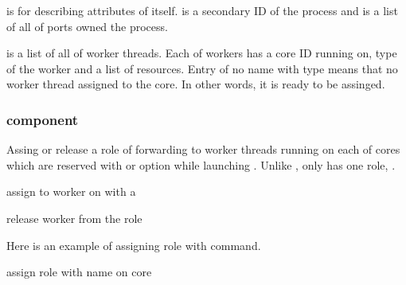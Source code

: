 \documentclass[a4paper,11pt,openany,oneside,english]{sphinxmanual}
\begin{document}
 is for describing attributes of  itself.
 is a secondary ID of the process and  is a list of
all of ports owned the process.

 is a list of all of worker threads. Each of workers has a
core ID running on, type of the worker and a list of resources.
Entry of no name with  type means that no worker thread assigned to
the core. In other words, it is ready to be assinged.


\subsubsection{component}
\label{\detokenize{commands/secondary/spp_mirror:component}}\label{\detokenize{commands/secondary/spp_mirror:commands-spp-mirror-component}}
Assing or release a role of forwarding to worker threads running on each of
cores which are reserved with  or  option while launching
. Unlike ,  only has one role, .

\begin{sphinxVerbatim}[commandchars=\\\{\},formatcom=\footnotesize]
 assign  to worker on  with a 

 release worker  from the role
\end{sphinxVerbatim}

Here is an example of assigning role with  command.

\begin{sphinxVerbatim}[commandchars=\\\{\},formatcom=\footnotesize]
 assign  role with name  on core 
\end{sphinxVerbatim}
\end{document}
